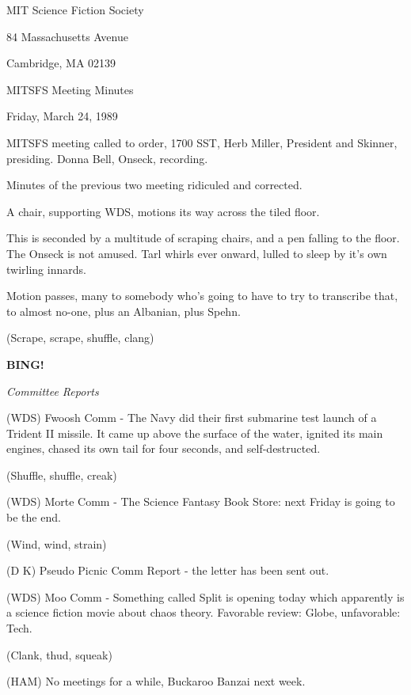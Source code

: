 \documentclass[12pt]{article}
\newcommand{\bing}{{\bf BING!} }
\newcommand{\goto}[1]{\bing \vskip 12pt \centerline{{\em{#1}}}}
\begin{document}
\begin{center}

MIT Science Fiction Society 

84 Massachusetts Avenue

Cambridge, MA 02139

\vspace{12pt}

MITSFS Meeting Minutes 

Friday, March 24, 1989

\end{center}
 
\vspace{18pt}

\setlength{\parskip}{6pt}

\noindent
MITSFS meeting called to order, 1700 SST, Herb Miller, President and Skinner, presiding. Donna Bell, Onseck, recording.

Minutes of the previous two meeting ridiculed and corrected.

A chair, supporting WDS, motions its way across the tiled floor.

This is seconded by a multitude of scraping chairs, and a pen falling to the floor.  The Onseck is not amused. Tarl whirls ever onward, lulled to sleep by it's own twirling innards.

Motion passes, many to somebody who's going to have to try to transcribe that, to almost no-one, plus an Albanian, plus Spehn.

(Scrape, scrape, shuffle, clang)

\goto{Committee Reports}

(WDS) Fwoosh Comm - The Navy did their first submarine test launch of a Trident II missile. It came up above the surface of the water, ignited its main engines, chased its own tail for four seconds, and self-destructed.

(Shuffle, shuffle, creak)

(WDS) Morte Comm - The Science Fantasy Book Store: next Friday is going to be the end.

(Wind, wind, strain)

(D K) Pseudo Picnic Comm Report - the letter has been sent out.

(WDS) Moo Comm - Something called Split is opening today which apparently is a science fiction movie about chaos theory. Favorable review: Globe, unfavorable: Tech.

(Clank, thud, squeak)

(HAM) No meetings for a while, Buckaroo Banzai next week.
\end{document}
